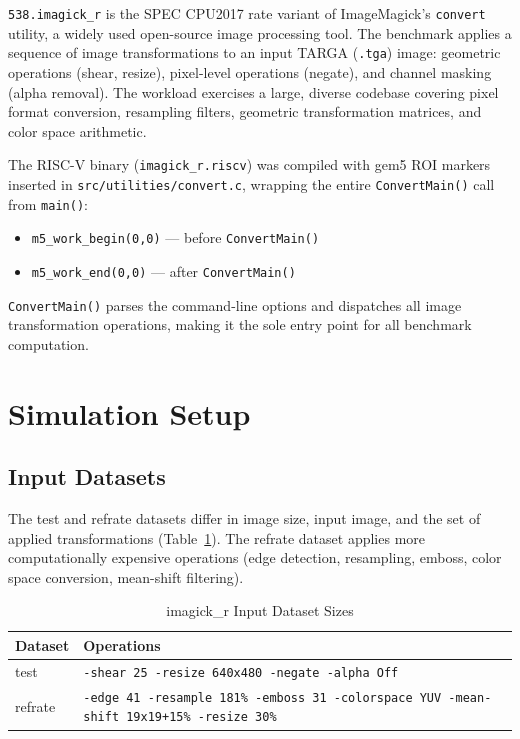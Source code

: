 \documentclass[conference]{IEEEtran}
\begin{document}
\texttt{538.imagick\_r} is the SPEC CPU2017 rate variant of
ImageMagick's \texttt{convert} utility, a widely used open-source
image processing tool. The benchmark applies a sequence of image
transformations to an input TARGA (\texttt{.tga}) image: geometric
operations (shear, resize), pixel-level operations (negate), and
channel masking (alpha removal). The workload exercises a large,
diverse codebase covering pixel format conversion, resampling filters,
geometric transformation matrices, and color space arithmetic.

The RISC-V binary (\texttt{imagick\_r.riscv}) was compiled with gem5
ROI markers inserted in \texttt{src/utilities/convert.c}, wrapping
the entire \texttt{ConvertMain()} call from \texttt{main()}:

\begin{itemize}
    \item \texttt{m5\_work\_begin(0,0)} --- before \texttt{ConvertMain()}
    \item \texttt{m5\_work\_end(0,0)}   --- after  \texttt{ConvertMain()}
\end{itemize}

\texttt{ConvertMain()} parses the command-line options and dispatches
all image transformation operations, making it the sole entry point
for all benchmark computation.

\section{Simulation Setup}

\subsection{Input Datasets}

The test and refrate datasets differ in image size, input image, and
the set of applied transformations (Table~\ref{tab:inputs}).
The refrate dataset applies more computationally expensive operations
(edge detection, resampling, emboss, color space conversion,
mean-shift filtering).

\begin{table}[H]
\centering
\caption{imagick\_r Input Dataset Sizes}
\label{tab:inputs}
\begin{tabular}{lp{5cm}}
\toprule
\textbf{Dataset} & \textbf{Operations} \\
\midrule
test    & \texttt{-shear 25 -resize 640x480 -negate -alpha Off} \\
refrate & \texttt{-edge 41 -resample 181\% -emboss 31 -colorspace YUV -mean-shift 19x19+15\% -resize 30\%} \\
\bottomrule
\end{tabular}
\end{table}
\end{document}
